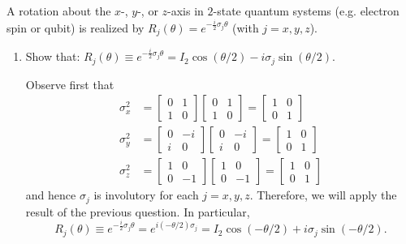 \documentclass{../../../kin_math}
\begin{document}
\begin{questions}
  \question A rotation about the $x$-, $y$-, or $z$-axis in $2$-state quantum systems (e.g. electron spin or qubit) is realized by $R_j(\theta) = e^{-\frac{i}{2} \sigma_j \theta}$ (with $j = x, y, z$).
  \begin{enumerate}
    \item Show that: $R_j(\theta) \equiv e^{-\frac{i}{2} \sigma_j \theta} = I_2 \cos(\theta / 2) - i \sigma_j \sin(\theta / 2)$.
    \begin{solution}
      Observe first that
      \begin{align*}
        \sigma_x^2 &= \begin{bmatrix} 0 & 1 \\ 1 & 0 \end{bmatrix} \begin{bmatrix} 0 & 1 \\ 1 & 0 \end{bmatrix} = \begin{bmatrix} 1 & 0 \\ 0 & 1 \end{bmatrix} \\
        \sigma_y^2 &= \begin{bmatrix} 0 & -i \\ i & 0 \end{bmatrix} \begin{bmatrix} 0 & -i \\ i & 0 \end{bmatrix} = \begin{bmatrix} 1 & 0 \\ 0 & 1 \end{bmatrix} \\
        \sigma_z^2 &= \begin{bmatrix} 1 & 0 \\ 0 & -1 \end{bmatrix} \begin{bmatrix} 1 & 0 \\ 0 & -1 \end{bmatrix} = \begin{bmatrix} 1 & 0 \\ 0 & 1 \end{bmatrix}
      \end{align*}
      and hence $\sigma_j$ is involutory for each $j = x, y, z$. Therefore, we will apply the result of the previous question. In particular,
      \begin{equation*}
        R_j(\theta) \equiv e^{-\frac{i}{2} \sigma_j \theta} = e^{i(- \theta / 2) \sigma_j} = I_2 \cos(-\theta / 2) + i \sigma_j \sin(-\theta / 2).

\end{equation*}
\end{solution}
\end{enumerate}
\end{questions}
\end{document}

